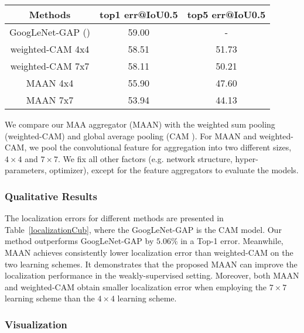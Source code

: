 \documentclass{article} \usepackage{iclr2019_conference,times}
\begin{document}
\begin{table*}[t]
\centering
\caption{ Localization error on CUB-200-2011 test set}
\begin{tabular}{c|c|c}
\hline
Methods          & top1 err@IoU0.5 & top5 err@IoU0.5 \\ \hline
GoogLeNet-GAP (\citep{zhou2016cvpr})              & 59.00   & -           \\ \hline
weighted-CAM 4x4  & 58.51         & 51.73               \\ weighted-CAM 7x7  & 58.11          & 50.21              \\ 
MAAN 4x4        & 55.90         & 47.60               \\
MAAN 7x7          & 53.94          & 44.13               \\ \hline \end{tabular}
\label{localizationCub}
\end{table*}
We compare our MAA aggregator (MAAN) with the weighted sum pooling (weighted-CAM) and global average pooling (CAM \citep{zhou2016cvpr}). For MAAN and weighted-CAM, we pool the convolutional feature for aggregation into two different sizes, $ 4 \times 4 $ and $ 7 \times 7 $. 
We fix all other factors (e.g. network structure, hyper-parameters, optimizer), except for the feature aggregators to evaluate the models. 

\subsubsection{Qualitative Results}

The localization errors for different methods are presented in Table~\ref{localizationCub}, where the GoogLeNet-GAP is the CAM model. Our method outperforms GoogLeNet-GAP by $ 5.06\%$ in a Top-1 error. Meanwhile, MAAN achieves consistently lower localization error than weighted-CAM on the two learning schemes. It demonstrates that the proposed MAAN can improve the localization performance in the weakly-supervised setting. Moreover, both MAAN and weighted-CAM obtain smaller localization error when employing the $7 \times 7$ learning scheme than the $4 \times 4$ learning scheme. 





\subsubsection{Visualization}
\end{document}

